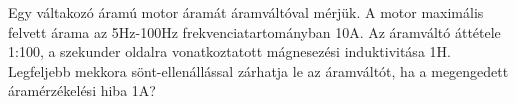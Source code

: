 \begin{example}

Egy váltakozó áramú motor áramát áramváltóval mérjük. A motor maximális felvett árama az 5Hz-100Hz frekvenciatartományban 10A. Az áramváltó áttétele 1:100, a szekunder oldalra vonatkoztatott mágnesezési induktivitása 1H. Legfeljebb mekkora sönt-ellenállással zárhatja le az áramváltót, ha a megengedett áramérzékelési hiba 1A?

\tcbline
\vspace{1mm}

\solution

\end{example}